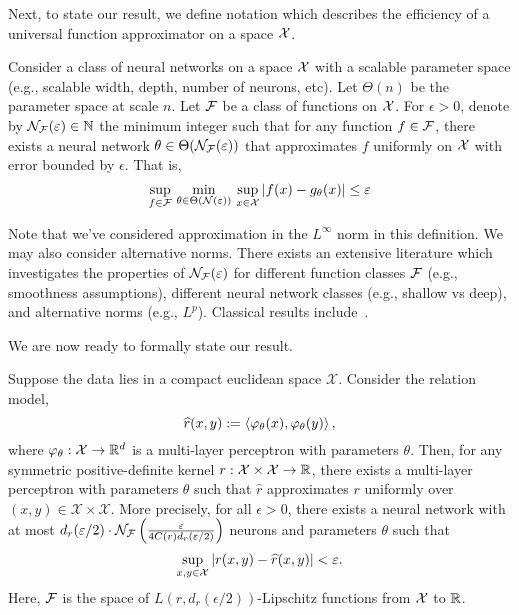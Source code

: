 Next, to state our result, we define notation which describes the efficiency of a universal function approximator on a space ${\mathcal{X}}$.
\begin{definition}\label{def:univ_approx_efficiency}
	Consider a class of neural networks on a space ${\mathcal{X}}$ with a scalable parameter space (e.g., scalable width, depth, number of neurons, etc). Let $\Theta(n)$ be the parameter space at scale $n$. Let ${\mathcal{F}}$ be a class of functions on ${\mathcal{X}}$. For $\epsilon > 0$, denote by ${\mathcal{N}}_{\mathcal{F}}(\varepsilon) \in \mathbb{N}$ the minimum integer such that for any function $f \in {\mathcal{F}}$, there exists a neural network $\theta \in \Theta({\mathcal{N}}_{\mathcal{F}}(\varepsilon))$ that approximates $f$ uniformly on ${\mathcal{X}}$ with error bounded by $\epsilon$. That is,
	\begin{equation*}
		\sup_{f \in \calF} \, \min_{\theta \in \Theta(\calN(\epsilon))} \,  \sup_{x \in \calX} \abs{f(x) - g_\theta(x)} \leq \epsilon
	\end{equation*}
\end{definition}

Note that we've considered approximation in the $L^\infty$ norm in this definition. We may also consider alternative norms. There exists an extensive literature which investigates the properties of ${\mathcal{N}}_{\mathcal{F}}(\varepsilon)$ for different function classes ${\mathcal{F}}$ (e.g., smoothness assumptions), different neural network classes (e.g., shallow vs deep), and alternative norms (e.g., $L^p$). Classical results include~\parencite{cybenkoApproximationSuperpositions1989,barronUniversalApproximation1993,hornikMultilayerFeedforward1989}.

We are now ready to formally state our result.

\begin{theorem}\label{theorem:symmetric_inner_prod_rels_func_class}
	Suppose the data lies in a compact euclidean space $\mathcal{X}$. Consider the relation model,
	\begin{equation*}
		\hat{r}(x, y) := \iprod{\phi_{\theta}(x)}{\phi_{\theta}(y)},
	\end{equation*}
	where $\varphi_{\theta}: {\mathcal{X}} \to \mathbb{R}^d$ is a multi-layer perceptron with parameters $\theta$. %
	Then, for any symmetric positive-definite kernel $r: {\mathcal{X}} \times {\mathcal{X}} \to \mathbb{R}$, there exists a multi-layer perceptron with parameters $\theta$ such that $\hat{r}$ approximates $r$ uniformly over $(x,y) \in \mathcal{X}\times\mathcal{X}$. More precisely, for all $\epsilon > 0$, there exists a neural network with at most $d_r(\varepsilon / 2) \cdot {\mathcal{N}}_{\mathcal{F}}\left(\frac{\varepsilon}{4 C(r) d_r(\varepsilon / 2)}\right)$ neurons and parameters $\theta$ such that
    \[\sup_{x,y \in \mathcal{X}}{\left\lvert r(x,y) - \widehat{r}(x,y)\right\rvert} < \varepsilon.\]
	Here, ${\mathcal{F}}$ is the space of $L(r, d_r(\epsilon/2))$-Lipschitz functions from ${\mathcal{X}}$ to $\mathbb{R}$.
\end{theorem}

